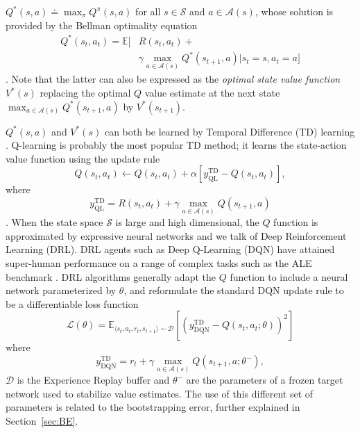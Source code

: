 $Q^*\left(s,a\right)\doteq\max_{\pi}Q^{\pi}\left(s,a\right)$ for all
$s\in\mathcal{S}$ and $a\in\mathcal{A}\left(s\right)$, whose solution
is provided by the Bellman optimality equation
\begin{equation}
\begin{aligned}
Q^*\left(s_t,a_t\right)=\mathbb{E}\bigg[&R\left(s_t,a_t\right)+\\ &\gamma
  \max_{a\in\mathcal{A}\left(s\right)}Q^*\left(s_{t+1},a\right)\bigg\vert
  s_t=s,a_t=a \bigg]
\end{aligned}
\end{equation}
\citep{bellman1957dynamic}. Note that the latter can
also be expressed as the \textit{optimal state value function}
$V^*\left(s\right)$ replacing the optimal $Q$ value estimate at
the next state
$\max_{a\in\mathcal{A}\left(s\right)}Q^*\left(s_{t+1},a\right)$ by
$V^*\left(s_{t+1}\right)$.

$Q^*\left(s,a\right)$ and $V^*\left(s\right)$ can both be learned by
Temporal Difference (TD) learning
\citep{sutton1988learning}. Q-learning is probably the most popular TD
method; it learns the state-action value function using the update
rule
\begin{equation}
Q\left(s_t,a_t\right)\leftarrow
Q\left(s_t,a_t\right)+\alpha\left[y^{\scriptscriptstyle
\textrm{TD}}_{\scriptscriptstyle \textrm{QL}}-Q\left(s_t,a_t\right)\right],
\end{equation}
where
\begin{equation}\label{eq:ql_td}
y^{\scriptscriptstyle \textrm{TD}}_{\scriptscriptstyle
\textrm{QL}}=R\left(s_t,a_t\right)+\gamma\max_{a\in\mathcal{A}\left(s\right)}Q\left(s_{t+1},a\right)
\end{equation}
\citep{watkins1992q}. When the state space $\mathcal{S}$ is large and
high dimensional, the $Q$ function is approximated by expressive
neural networks and we talk of Deep Reinforcement Learning
(DRL). DRL agents such as Deep Q-Learning (DQN)
\citep{mnih2013playing} have attained super-human performance on a
range of complex tasks such as the ALE benchmark
\citep{bellemare2013arcade}. DRL algorithms generally adapt the $Q$
function to include a neural network parameterized by $\theta$, and
reformulate the standard DQN update rule to be a differentiable loss
function
\begin{equation}
\mathcal{L}(\theta)=\mathbb{E}_{\langle s_t,a_t,r_t,s_{t+1}\rangle\sim
\mathcal{D}}\left[{\left(y^{\scriptscriptstyle \textrm{TD}}_{\scriptscriptstyle
\textrm{DQN}}-Q\left(s_t, a_t;\theta\right)\right)}^2\right]
\end{equation}
where
\begin{equation}\label{eq:dqn_td}
y^{\scriptscriptstyle \textrm{TD}}_{\scriptscriptstyle
\textrm{DQN}}=r_t+\gamma\max_{a\in\mathcal{A}(s)}Q\left(s_{t+1},a;\theta^{-}\right),
\end{equation}
$\mathcal{D}$ is the Experience Replay buffer
\citep{lin1992self} and $\theta^-$ are the parameters of a frozen
target network used to stabilize value estimates. The use of this
different set of parameters is related to the bootstrapping error,
further explained in Section~\ref{sec:BE}.

